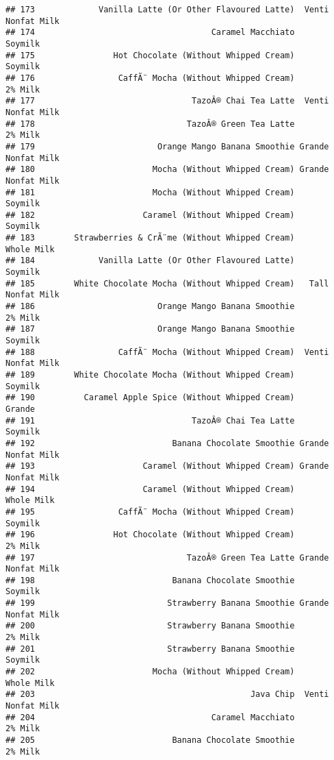 \documentclass[
]{article}
\begin{document}
\begin{verbatim}
## 173             Vanilla Latte (Or Other Flavoured Latte)  Venti Nonfat Milk
## 174                                    Caramel Macchiato            Soymilk
## 175                Hot Chocolate (Without Whipped Cream)            Soymilk
## 176                 CaffÃ¨ Mocha (Without Whipped Cream)            2% Milk
## 177                                TazoÂ® Chai Tea Latte  Venti Nonfat Milk
## 178                               TazoÂ® Green Tea Latte            2% Milk
## 179                         Orange Mango Banana Smoothie Grande Nonfat Milk
## 180                        Mocha (Without Whipped Cream) Grande Nonfat Milk
## 181                        Mocha (Without Whipped Cream)            Soymilk
## 182                      Caramel (Without Whipped Cream)            Soymilk
## 183        Strawberries & CrÃ¨me (Without Whipped Cream)         Whole Milk
## 184             Vanilla Latte (Or Other Flavoured Latte)            Soymilk
## 185        White Chocolate Mocha (Without Whipped Cream)   Tall Nonfat Milk
## 186                         Orange Mango Banana Smoothie            2% Milk
## 187                         Orange Mango Banana Smoothie            Soymilk
## 188                 CaffÃ¨ Mocha (Without Whipped Cream)  Venti Nonfat Milk
## 189        White Chocolate Mocha (Without Whipped Cream)            Soymilk
## 190          Caramel Apple Spice (Without Whipped Cream)             Grande
## 191                                TazoÂ® Chai Tea Latte            Soymilk
## 192                            Banana Chocolate Smoothie Grande Nonfat Milk
## 193                      Caramel (Without Whipped Cream) Grande Nonfat Milk
## 194                      Caramel (Without Whipped Cream)         Whole Milk
## 195                 CaffÃ¨ Mocha (Without Whipped Cream)            Soymilk
## 196                Hot Chocolate (Without Whipped Cream)            2% Milk
## 197                               TazoÂ® Green Tea Latte Grande Nonfat Milk
## 198                            Banana Chocolate Smoothie            Soymilk
## 199                           Strawberry Banana Smoothie Grande Nonfat Milk
## 200                           Strawberry Banana Smoothie            2% Milk
## 201                           Strawberry Banana Smoothie            Soymilk
## 202                        Mocha (Without Whipped Cream)         Whole Milk
## 203                                            Java Chip  Venti Nonfat Milk
## 204                                    Caramel Macchiato            2% Milk
## 205                            Banana Chocolate Smoothie            2% Milk

\end{verbatim}
\end{document}
